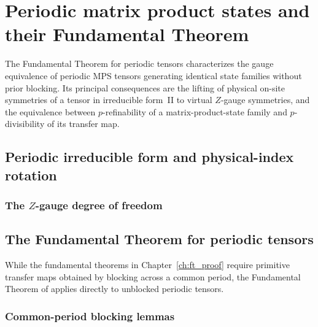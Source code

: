 
\chapter{Periodic matrix product states and their Fundamental Theorem}%
\label{ch:periodic_ft_apps}

The Fundamental Theorem for periodic tensors
\cite{DeLasCuevas2017Irreducible} characterizes the gauge equivalence of
periodic MPS tensors generating identical state families without prior blocking.
Its principal consequences are the lifting of physical on-site symmetries of a
tensor in irreducible form~II to virtual $Z$-gauge symmetries, and the
equivalence between $p$-refinability of a matrix-product-state family and
$p$-divisibility of its transfer map.

\section{Periodic irreducible form and physical-index rotation}%
\label{sec:periodic_irreducible_rotation}


\subsection{The \texorpdfstring{$Z$}{Z}-gauge degree of freedom}


\section{The Fundamental Theorem for periodic tensors}%
\label{sec:periodic_ft}

While the fundamental theorems in Chapter~\ref{ch:ft_proof} require primitive
transfer maps obtained by blocking across a common period, the Fundamental
Theorem of \cite{DeLasCuevas2017Irreducible} applies directly to unblocked
periodic tensors.

\subsection{Common-period blocking lemmas}

